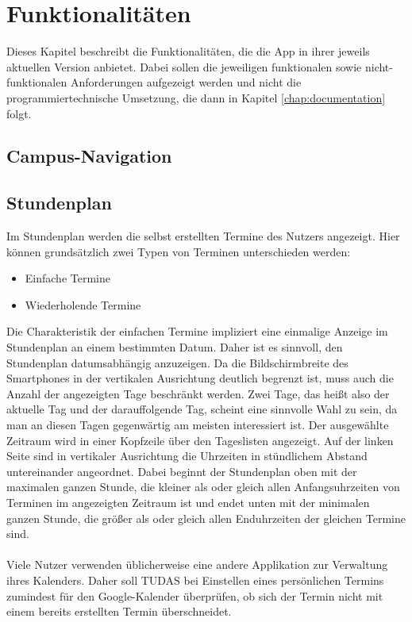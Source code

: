 \documentclass[noindent]{tudreport}
\begin{document}
	\chapter{Funktionalitäten}\label{chap:functionalities}
		Dieses Kapitel beschreibt die Funktionalitäten, die die App in ihrer jeweils aktuellen Version anbietet. Dabei sollen die jeweiligen funktionalen sowie nicht-funktionalen Anforderungen aufgezeigt werden und nicht die programmiertechnische Umsetzung, die dann in Kapitel \ref{chap:documentation} folgt.
		
		\section{Campus-Navigation}\label{sec:campus_navigation}
		
		\section{Stundenplan}\label{sec:timetable}
			Im Stundenplan werden die selbst erstellten Termine des Nutzers angezeigt. Hier können grundsätzlich zwei Typen von Terminen unterschieden werden:
			\begin{itemize}
				\item Einfache Termine
				
				\item Wiederholende Termine
			\end{itemize}
			Die Charakteristik der einfachen Termine impliziert eine einmalige Anzeige im Stundenplan an einem bestimmten Datum. Daher ist es sinnvoll, den Stundenplan datumsabhängig anzuzeigen. Da die Bildschirmbreite des Smartphones in der vertikalen Ausrichtung deutlich begrenzt ist, muss auch die Anzahl der angezeigten Tage beschränkt werden. Zwei Tage, das heißt also der aktuelle Tag und der darauffolgende Tag, scheint eine sinnvolle Wahl zu sein, da man an diesen Tagen gegenwärtig am meisten interessiert ist. Der ausgewählte Zeitraum wird in einer Kopfzeile über den Tageslisten angezeigt. Auf der linken Seite sind in vertikaler Ausrichtung die Uhrzeiten in stündlichem Abstand untereinander angeordnet. Dabei beginnt der Stundenplan oben mit der maximalen ganzen Stunde, die kleiner als oder gleich allen Anfangsuhrzeiten von Terminen im angezeigten Zeitraum ist und endet unten mit der minimalen ganzen Stunde, die größer als oder gleich allen Enduhrzeiten der gleichen Termine sind.\\\\
			Viele Nutzer verwenden üblicherweise eine andere Applikation zur Verwaltung ihres Kalenders. Daher soll TUDAS bei Einstellen eines persönlichen Termins zumindest für den Google-Kalender überprüfen, ob sich der Termin nicht mit einem bereits erstellten Termin überschneidet.
		
\end{document}
